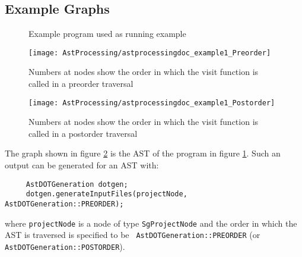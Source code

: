 \subsection{Example Graphs}

\begin{figure}
\begin{latexonly}
   
\end{latexonly}

\begin{htmlonly}
   
\end{htmlonly}
\caption{Example program used as running example}
\label{AstProcessing:example1}
\end{figure}

\begin{figure}
\texttt{[image: AstProcessing/astprocessingdoc\_example1\_Preorder]}
\caption{Numbers at nodes show the order in which the visit function is called in a preorder traversal}
\label{AstProcessing:PreorderAst}
\end{figure}

\begin{figure}
\texttt{[image: AstProcessing/astprocessingdoc\_example1\_Postorder]}
\caption{Numbers at nodes show the order in which the visit function is called in a postorder traversal}
\label{introduction:PostorderAst}
\end{figure}

The graph shown in figure \ref{AstProcessing:PreorderAst} is the AST of
the program in figure \ref{AstProcessing:example1}. Such an output can
be generated for an AST with:

{\indent
{\mySmallFontSize
\begin{verbatim}
     AstDOTGeneration dotgen;
     dotgen.generateInputFiles(projectNode, AstDOTGeneration::PREORDER);
\end{verbatim}
}}
where {\tt projectNode} is a node of type {\tt SgProjectNode} and the
order in which the AST is traversed is specified to be {\tt
AstDOTGeneration::PREORDER} (or {\tt AstDOTGeneration::POSTORDER}).

